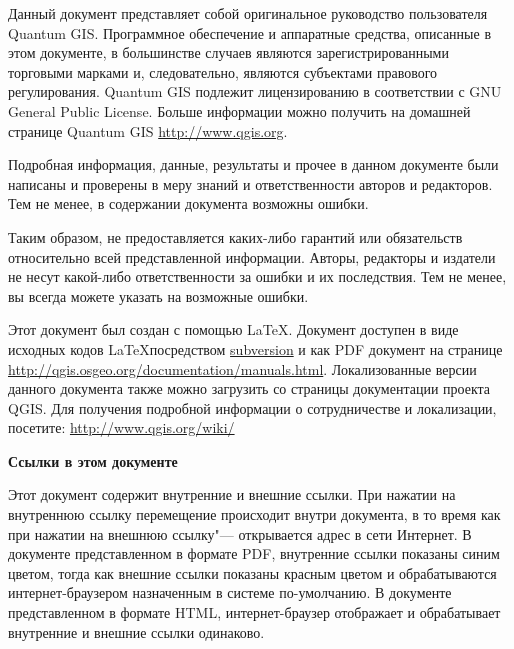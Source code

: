 \frontmatter
\pagestyle{scrplain}
\vspace{1cm}


Данный документ представляет собой оригинальное руководство пользователя
Quantum GIS. Программное обеспечение и аппаратные средства, описанные в
этом документе, в большинстве случаев являются зарегистрированными
торговыми марками и, следовательно, являются субъектами правового
регулирования. Quantum GIS подлежит лицензированию в соответствии с GNU
General Public License. Больше информации можно получить на домашней
странице Quantum GIS \url{http://www.qgis.org}.
\par\bigskip
Подробная информация, данные, результаты и прочее в данном документе
были написаны и проверены в меру знаний и ответственности авторов и
редакторов. Тем не менее, в содержании документа возможны ошибки.
\par\bigskip
Таким образом, не предоставляется каких-либо гарантий или обязательств
относительно всей представленной информации. Авторы, редакторы и
издатели не несут какой-либо ответственности за ошибки и их последствия.
Тем не менее, вы всегда можете указать на возможные ошибки.
\par\bigskip
Этот документ был создан с помощью \LaTeX. Документ доступен в виде
исходных кодов \LaTeX посредством
\href{http://wiki.qgis.org/qgiswiki/DocumentationWritersCorner}{subversion}
и как PDF документ на странице
\url{http://qgis.osgeo.org/documentation/manuals.html}.
Локализованные версии данного документа также можно загрузить со
страницы документации проекта QGIS. Для получения подробной информации
о сотрудничестве и локализации, посетите: \url{http://www.qgis.org/wiki/}

\vspace{1cm}
\noindent
\textbf{Ссылки в этом документе}
\par\bigskip
Этот документ содержит внутренние и внешние ссылки. При нажатии на
внутреннюю ссылку перемещение происходит внутри документа, в то время
как при нажатии на внешнюю ссылку"--- открывается адрес в сети Интернет.
В документе представленном в формате PDF, внутренние ссылки показаны
синим цветом, тогда как внешние ссылки показаны красным цветом и
обрабатываются интернет-браузером назначенным в системе по-умолчанию. В
документе представленном в формате HTML, интернет-браузер отображает и
обрабатывает внутренние и внешние ссылки одинаково.

